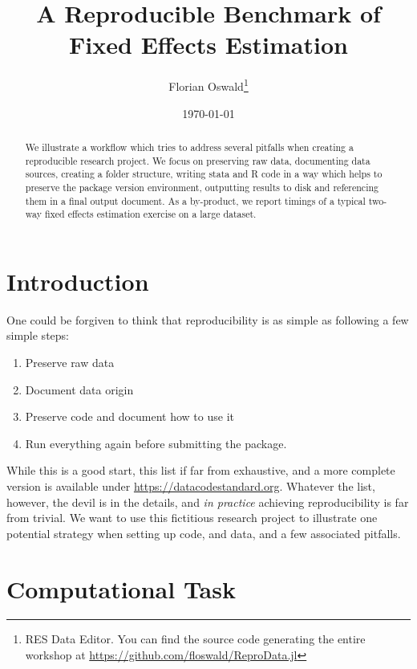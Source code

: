 \documentclass[12pt]{article}
\begin{document}
\onehalfspacing
    
    
\title{A Reproducible Benchmark of Fixed Effects Estimation}



\author{Florian Oswald\thanks{RES Data Editor. You can find the source code generating the entire workshop at \url{https://github.com/floswald/ReproData.jl}}}
\date{\today}


\maketitle
\begin{abstract}
We illustrate a workflow which tries to address several pitfalls when creating a reproducible research project. We focus on preserving raw data, documenting data sources, creating a folder structure, writing stata and R code in a way which helps to preserve the package version environment, outputting results to disk and referencing them in a final output document. As a by-product, we report timings of a typical two-way fixed effects estimation exercise on a large dataset.    
\end{abstract}

\section{Introduction}

One could be forgiven to think that reproducibility is as simple as following a few simple steps:

\begin{enumerate}
\item Preserve raw data
\item Document data origin
\item Preserve code and document how to use it
\item Run everything again before submitting the package.
\end{enumerate}

While this is a good start, this list if far from exhaustive, and a more complete version is available under \url{https://datacodestandard.org}. Whatever the list, however, the devil is in the details, and \emph{in practice} achieving reproducibility is far from trivial. We want to use this fictitious research project to illustrate one potential strategy when setting up code, and data, and a few associated pitfalls. 

\section{Computational Task}
\end{document}
